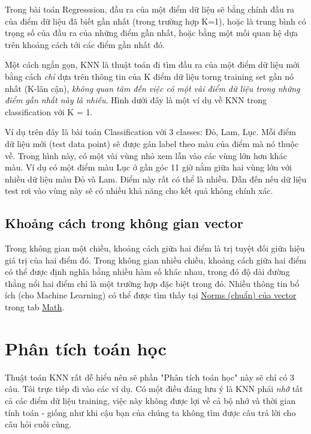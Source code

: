 Trong bài toán Regresssion, đầu ra của một điểm dữ liệu sẽ bằng chính đầu ra của điểm dữ liệu đã biết gần nhất (trong trường hợp K=1), hoặc là trung bình có trọng số của đầu ra của những điểm gần nhất, hoặc bằng một mối quan hệ dựa trên khoảng cách tới các điểm gần nhất đó.  
 
Một cách ngắn gọn, KNN là thuật toán đi tìm đầu ra của một điểm dữ liệu mới bằng cách \textit{chỉ} dựa trên thông tin của K điểm dữ liệu torng training set gần nó nhất (K-lân cận), \textit{không quan tâm đến việc có một vài điểm dữ liệu trong những điểm gần nhất này là nhiễu}. Hình dưới đây là một ví dụ về KNN trong classification với K = 1. 
 
 
Ví dụ trên đây là bài toán Classification với 3 classes: Đỏ, Lam, Lục. Mỗi điểm dữ liệu mới (test data point) sẽ được gán label theo màu của điểm mà nó thuộc về. Trong hình này, có một vài vùng nhỏ xem lẫn vào các vùng lớn hơn khác màu. Ví dụ có một điểm màu Lục ở gần góc 11 giờ nằm giữa hai vùng lớn với nhiều dữ liệu màu Đỏ và Lam. Điểm này rất có thể là nhiễu. Dẫn đến nếu dữ liệu test rơi vào vùng này sẽ có nhiều khả năng cho kết quả không chính xác.  
 
 
 
 
\subsection{Khoảng cách trong không gian vector}
 
Trong không gian một chiều, khoảng cách giữa hai điểm là trị tuyệt đối giữa hiệu giá trị của hai điểm đó. Trong không gian nhiều chiều, khoảng cách giữa hai điểm có thể được định nghĩa bằng nhiều hàm số khác nhau, trong đó độ dài đường thằng nổi hai điểm chỉ là một trường hợp đặc biệt trong đó. Nhiều thông tin bổ ích (cho Machine Learning) có thể được tìm thấy tại \href{http://machinelearningcoban.com/math/#norms-chuan}{Norms (chuẩn) của vector} trong tab \href{http://machinelearningcoban.com/math/}{Math}. 
 
 
 
 
\section{Phân tích toán học}
Thuật toán KNN rất dễ hiểu nên sẽ phần "Phân tích toán học" này sẽ chỉ có 3 câu. Tôi trực tiếp đi vào các ví dụ. Có một điều đáng lưu ý là KNN phải \textit{nhớ} tất cả các điểm dữ liệu training, việc này không được lợi về cả bộ nhớ và thời gian tính toán - giống như khi cậu bạn của chúng ta không tìm được câu trả lời cho câu hỏi cuối cùng. 
 
